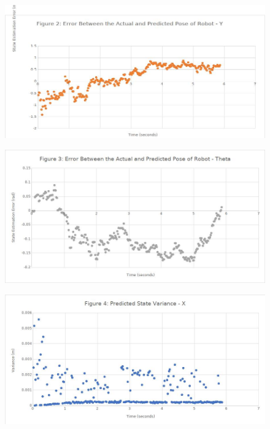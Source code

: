 \documentclass[journal]{IEEEtran}
\begin{document}
\begin{figure}[!t]%
\centering
\includegraphics[width=0.9\linewidth]{Figures/2-actual-predicted-error-y.jpg}
\caption{}
\label{fig:2}
\end{figure}

\begin{figure}[!t]%
\centering
\includegraphics[width=0.9\linewidth]{Figures/3-actual-predicted-error-theta.jpg}
\caption{}
\label{fig:3}
\end{figure}

\begin{figure}[!t]%
\centering
\includegraphics[width=0.9\linewidth]{Figures/4-pred-state-var-x.jpg}
\caption{}
\label{fig:4}
\end{figure}
\end{document}
